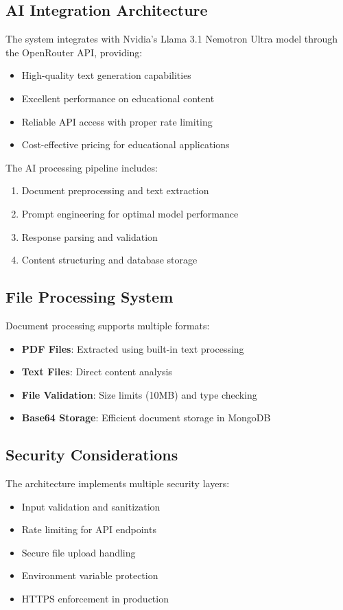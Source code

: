 \documentclass[conference]{IEEEtran}
\begin{document}
\subsection{AI Integration Architecture}

The system integrates with Nvidia's Llama 3.1 Nemotron Ultra model through the OpenRouter API, providing:

\begin{itemize}
\item High-quality text generation capabilities
\item Excellent performance on educational content
\item Reliable API access with proper rate limiting
\item Cost-effective pricing for educational applications
\end{itemize}

The AI processing pipeline includes:
\begin{enumerate}
\item Document preprocessing and text extraction
\item Prompt engineering for optimal model performance
\item Response parsing and validation
\item Content structuring and database storage
\end{enumerate}

\subsection{File Processing System}

Document processing supports multiple formats:
\begin{itemize}
\item \textbf{PDF Files}: Extracted using built-in text processing
\item \textbf{Text Files}: Direct content analysis
\item \textbf{File Validation}: Size limits (10MB) and type checking
\item \textbf{Base64 Storage}: Efficient document storage in MongoDB
\end{itemize}

\subsection{Security Considerations}

The architecture implements multiple security layers:
\begin{itemize}
\item Input validation and sanitization
\item Rate limiting for API endpoints
\item Secure file upload handling
\item Environment variable protection
\item HTTPS enforcement in production
\end{itemize}
\end{document}
